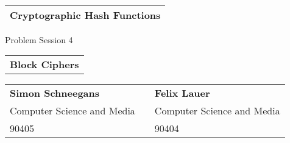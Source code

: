 \thispagestyle{empty}
\ \\[3cm]
\begin{tabular}[b]{l}
    \Huge \textbf{Cryptographic Hash Functions} \hspace{12.5cm} \\[1mm]
    \hline
\end{tabular}

\begin{flushright}
    {\large Problem Session 4} \\[8cm]
\end{flushright}

\begin{tabular}[b]{l}
    \LARGE \textbf{Block Ciphers} \\[4cm]
\end{tabular}

\begin{tabular}{lcl}
    \textbf{Simon Schneegans} &\hspace{1cm} & \textbf{Felix Lauer} \\
    Computer Science and Media & \hspace{1cm}  & Computer Science and Media\\
    90405  &\hspace{1cm} & 90404 \\[1.5cm]
\end{tabular}

\newpage

